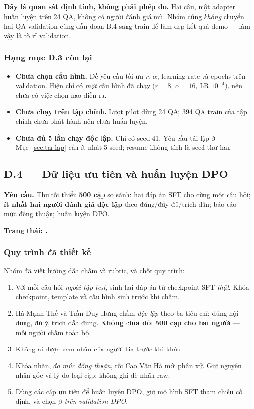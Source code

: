 \textbf{Đây là quan sát định tính, không phải phép đo.} Hai câu, một adapter huấn
luyện trên 24 QA, không có người đánh giá mù. Nhóm cũng \emph{không} chuyển hai QA
validation cùng dẫn đoạn B.4 sang train để làm đẹp kết quả demo --- làm vậy là rò
rỉ validation.

\subsubsection{Hạng mục D.3 còn lại \chualam}

\begin{itemize}[leftmargin=2em]
\item \textbf{Chưa chọn cấu hình.} Đề yêu cầu tối ưu $r$, $\alpha$, learning rate
và epochs trên validation. Hiện chỉ có \emph{một} cấu hình đã chạy ($r=8$,
$\alpha=16$, LR $10^{-4}$), nên chưa có việc chọn nào diễn ra.
\item \textbf{Chưa chạy trên tập chính.} Lượt pilot dùng 24 QA; 394 QA train của
tập chính chưa phát hành nên chưa huấn luyện.
\item \textbf{Chưa đủ 5 lần chạy độc lập.} Chỉ có seed 41. Yêu cầu tái lập ở
Mục~\ref{sec:tai-lap} cần ít nhất 5 seed; resume không tính là seed thứ hai.
\end{itemize}

\subsection{D.4 --- Dữ liệu ưu tiên và huấn luyện DPO}
\label{sec:d4}

\textbf{Yêu cầu.} Thu tối thiểu \textbf{500 cặp} so sánh: hai đáp án SFT cho cùng
một câu hỏi; \textbf{ít nhất hai người đánh giá độc lập} theo đúng/đầy đủ/trích
dẫn; báo cáo mức đồng thuận; huấn luyện DPO.

\textbf{Trạng thái: \chualam.}

\subsubsection{Quy trình đã thiết kế}

Nhóm đã viết hướng dẫn chấm và rubric, và chốt quy trình:

\begin{enumerate}[leftmargin=2em]
\item Với mỗi câu hỏi \emph{ngoài tập test}, sinh hai đáp án từ checkpoint SFT
\emph{thật}. Khóa checkpoint, template và cấu hình sinh trước khi chấm.
\item Hà Mạnh Thế và Trần Duy Hưng chấm \emph{độc lập} theo ba tiêu chí: đúng nội
dung, đủ ý, trích dẫn đúng. \textbf{Không chia đôi 500 cặp cho hai người} --- mỗi
người chấm toàn bộ.
\item Không ai được xem nhãn của người kia trước khi khóa.
\item Khóa nhãn, \emph{đo mức đồng thuận}, rồi Cao Văn Hà mới phân xử. Giữ nguyên
nhãn gốc và lý do loại cặp; không ghi đè nhãn raw.
\item Dùng các cặp ưu tiên để huấn luyện DPO, giữ mô hình SFT tham chiếu cố định,
và chọn $\beta$ \emph{trên validation DPO}.
\end{enumerate}

